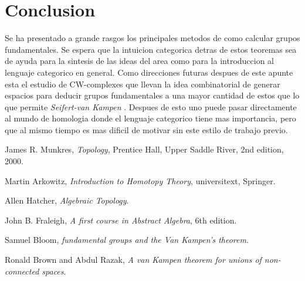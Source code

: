 \documentclass[letterpaper]{article}
\newcommand{\vank}{\emph{Seifert-van Kampen} }
\theoremstyle{definition}
\theoremstyle{plain}
\theoremstyle{plain}
\theoremstyle{plain}
\theoremstyle{plain}
\theoremstyle{remark}
\theoremstyle{remark}
\begin{document}
\section{Conclusion}
Se ha presentado a grande rasgos los principales metodos de como
calcular grupos fundamentales. Se espera que la intuicion categorica
detras de estos teoremas sea de ayuda para la sintesis de las ideas del
area como para la introduccion al lenguaje categorico en general. Como
direcciones futuras despues de este apunte esta el estudio de
CW-complexes que llevan la idea combinatorial de generar espacios para
deducir grupos fundamentales a una mayor cantidad de estos que lo que
permite \vank . Despues de esto uno puede pasar directamente al mundo de
homologia donde el lenguaje categorico tiene mas importancia, pero que
al mismo tiempo es mas dificil de motivar sin este estilo de trabajo previo.
\begin{thebibliography}{9}

  James R. Munkres,
  \emph{Topology},
  Prentice Hall, Upper Saddle River,
  2nd edition,
  2000.

  Martin Arkowitz,
  \emph{Introduction to Homotopy Theory},
  universitext, Springer.

  Allen Hatcher,
  \emph{Algebraic Topology}.

  John B. Fraleigh,
  \emph{A first course in Abstract Algebra},
  6th edition.

  Samuel Bloom,
  \emph{fundamental  groups  and  the  Van  Kampen’s theorem}.

  Ronald Brown and Abdul Razak,
  \emph{A van Kampen theorem for unions of non-connected spaces}.
\end{thebibliography}
\end{document}
